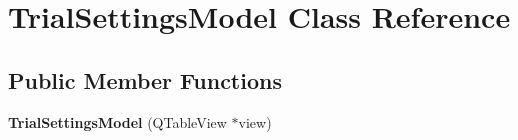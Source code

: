 \hypertarget{class_trial_settings_model}{\section{Trial\+Settings\+Model Class Reference}
\label{class_trial_settings_model}
}
\subsection*{Public Member Functions}
\begin{DoxyCompactItemize}
\item 
\hypertarget{class_trial_settings_model_a836ff2525113e876c29dab1d18d1dfee}{{\bfseries Trial\+Settings\+Model} (Q\+Table\+View $\ast$view)}\label{class_trial_settings_model_a836ff2525113e876c29dab1d18d1dfee}


\end{DoxyCompactItemize}
